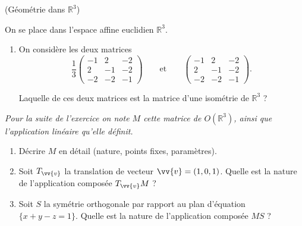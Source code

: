 \documentclass[a4paper,12pt,reqno]{amsart}
\begin{document}
\begin{exo} (Géométrie dans $\mathbb{R}^{3}$)

  On se place dans l'espace affine euclidien $\mathbb{R}^{3}$.

  \begin{enumerate}

    \item On considère les deux matrices
    \[
      \renewcommand{\arraystretch}{.77}
      \frac{1}{3}
      \begin{pmatrix}
        -1 & 2 & -2 \\
         2 &-1 & -2 \\
        -2 &-2 & -1
      \end{pmatrix}
      \qquad\text{et}\qquad
      \begin{pmatrix}
        -1 & 2 & -2 \\
         2 &-1 & -2 \\
        -2 &-2 & -1
      \end{pmatrix}
    .\]

    Laquelle de ces deux matrices est la matrice d'une isométrie de $\mathbb{R}^{3}$ ?
  \end{enumerate}

    \emph{Pour la suite de l'exercice on note $M$ cette matrice de $O(\mathbb{R}^{3})$, ainsi que l'application linéaire qu'elle définit.}

  \begin{enumerate}[resume]

    \item Décrire $M$ en détail (nature, points fixes, paramètres).

    \item Soit $T_{\vv{v}}$ la translation de vecteur $\vv{v} = (1,0,1)$. Quelle est la nature de l'application composée $T_{\vv{v}}M$ ?

    \item Soit $S$ la symétrie orthogonale par rapport au plan d'équation $\{x+y-z=1\}$. Quelle est la nature de l'application composée $MS$ ?
  \end{enumerate}
\end{exo}
\end{document}

